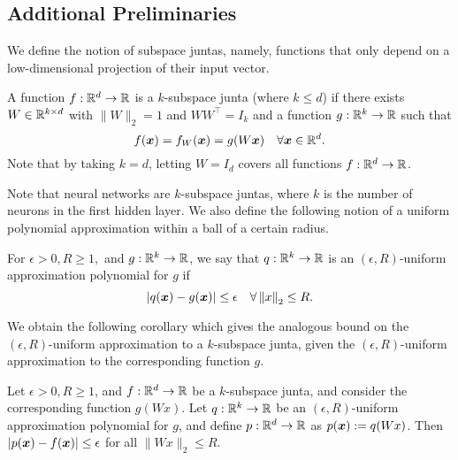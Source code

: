 \documentclass[11pt]{article} %
\numberwithin{equation}{section}
\begin{document}
\subsection{Additional Preliminaries}\label{section:unbounded-overview}

We define the notion of subspace juntas, namely, functions that only depend on a low-dimensional projection of their input vector.

\begin{definition}
    A function $f: \mathbb{R}^d \rightarrow \mathbb{R}$ is a $k$-subspace junta (where $k \le d$) if there exists $W \in \mathbb{R}^{k \times d}$ with $\|W\|_2 = 1$ and $WW^{\top} = I_k$ and a function $g: \mathbb{R}^k \rightarrow \mathbb{R}$ such that
    \[ f({\bm{x}}) = f_W({\bm{x}}) = g(W{\bm{x}}) \quad \forall {\bm{x}} \in \mathbb{R}^d. \]
    Note that by taking $k = d$, letting $W = I_d$ covers all functions $f: \mathbb{R}^d \rightarrow \mathbb{R}$.
\end{definition}

Note that neural networks are $k$-subspace juntas, where $k$ is the number of neurons in the first hidden layer. We also define the following notion of a uniform polynomial approximation within a ball of a certain radius.

\begin{definition}
    For $\epsilon > 0, R \ge 1,$ and $g: \mathbb{R}^k \rightarrow \mathbb{R}$, we say that $q: \mathbb{R}^k \rightarrow \mathbb{R}$ is an $(\epsilon, R)$-uniform approximation polynomial for $g$ if
        \[|q({\bm{x}}) - g({\bm{x}})| \le \epsilon \quad \forall \left\| x \right\|_2 \le R.\]
\end{definition}

We obtain the following corollary which gives the analogous bound on the $(\epsilon, R)$-uniform approximation to a $k$-subspace junta, given the $(\epsilon, R)$-uniform approximation to the corresponding function $g$.
\begin{corollary}
    Let $\epsilon > 0, R \ge 1$, and $f: \mathbb{R}^d \rightarrow \mathbb{R}$ be a $k$-subspace junta, and consider the corresponding function $g(Wx)$. Let $q: \mathbb{R}^k \rightarrow \mathbb{R}$ be an $(\epsilon, R)$-uniform approximation polynomial for $g$, and define $p: \mathbb{R}^d \rightarrow \mathbb{R}$ as $p({\bm{x}}) := q(Wx)$. Then $|p({\bm{x}}) - f({\bm{x}})| \le \epsilon$ for all $\|Wx\|_2 \le R$.
\end{corollary}
\end{document}
